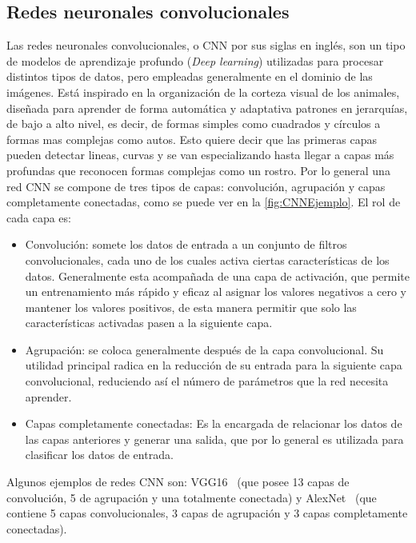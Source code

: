 \subsection{Redes neuronales convolucionales} \label{sec:redesneuronalesconvolucionales}
Las redes neuronales convolucionales, o CNN por sus siglas en inglés, son un tipo de modelos de aprendizaje profundo (\textit{Deep learning}) utilizadas  para procesar distintos tipos de datos, pero empleadas generalmente en el dominio de las imágenes. Está inspirado en la organización de la corteza visual de los animales, diseñada para aprender de forma automática y adaptativa patrones en jerarquías, de bajo a alto nivel, es decir, de formas simples como cuadrados y círculos a formas mas complejas como autos. Esto quiere decir que las primeras capas pueden detectar lineas, curvas y se van especializando hasta llegar a capas más profundas que reconocen formas complejas como un rostro. Por lo general una red CNN se compone de tres tipos de capas: convolución, agrupación y capas completamente conectadas, como se puede ver en la \autoref{fig:CNNEjemplo}. El rol de cada capa es:

\begin{itemize}
	\item Convolución: somete los datos de entrada a un conjunto de filtros convolucionales, cada uno de los cuales activa ciertas características de los datos. Generalmente esta acompañada de una capa de activación, que permite un entrenamiento más rápido y eficaz al asignar los valores negativos a cero y mantener los valores positivos, de esta manera permitir que solo las características activadas pasen a la siguiente capa.
	\item Agrupación: se coloca generalmente después de la capa convolucional. Su utilidad principal radica en la reducción de su entrada para la siguiente capa convolucional, reduciendo así el número de parámetros que la red necesita aprender.
	\item Capas completamente conectadas: Es la encargada de relacionar los datos de las capas anteriores y generar una salida, que por lo general es utilizada para clasificar los datos de entrada.
\end{itemize}


Algunos ejemplos de redes CNN son: VGG16~\cite{simonyan2014very} (que posee 13 capas de convolución, 5 de agrupación y una totalmente conectada) y AlexNet~\cite{krizhevsky2012imagenet} (que contiene 5 capas convolucionales, 3 capas de agrupación y 3 capas completamente conectadas).\\


